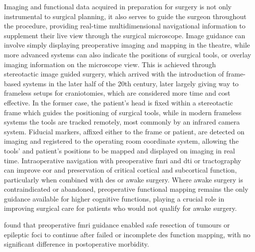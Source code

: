 \documentclass[12pt,phd,a4paper,twoside]{ucl_thesis}
\renewcommand{\textcite}[2][]{
\ifthenelse { \equal {#1} {} }  {\citeauthor{#2}\autocite{#2}}   {\citeauthor{#1}\autocite{#2}}}
\begin{document}
Imaging and functional data acquired in preparation for surgery is not only instrumental to surgical planning, it also serves to guide the surgeon throughout the procedure, providing real-time multidimensional navigational information to supplement their live view through the surgical microscope.
Image guidance can involve simply displaying preoperative imaging and mapping in the theatre, while more advanced systems can also indicate the positions of surgical tools, or overlay imaging information on the microscope view.
This is achieved through stereotactic image guided surgery, which arrived with the introduction of frame-based systems in the later half of the 20th century, later largely giving way to frameless setups for craniotomies\autocite{Sandeman1995}, which are considered more time and cost effective\autocite{Sattur2019}.
In the former case, the patient's head is fixed within a stereotactic frame which guides the positioning of surgical tools, while in modern frameless systems the tools are tracked remotely, most commonly by an infrared camera system\autocite{Sattur2019}.
Fiducial markers, affixed either to the frame or patient, are detected on imaging and registered to the operating room coordinate system, allowing the tools' and patient's positions to be mapped and displayed on imaging in real time.
Intraoperative navigation with preoperative \gls{fmri} and \gls{dti} or tractography can improve \gls{eor} and preservation of critical cortical and subcortical function\autocite{Wu2007,Bello2008,Bello2010d}, particularly when combined with \gls{des} or awake surgery\autocite{Aibar-Duran2020}.
Where awake surgery is contraindicated or abandoned, preoperative functional mapping remains the only guidance available for higher cognitive functions, playing a crucial role in improving surgical care for patients who would not qualify for awake surgery.
\textcite{Rigolo2020a} found that preoperative \gls{fmri} guidance enabled safe resection of tumours or epileptic foci to continue after failed or incomplete \gls{des} function mapping, with no significant difference in postoperative morbidity.
\end{document}

